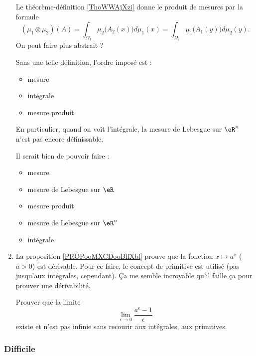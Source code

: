 \begin{enumerate}
        Le théorème-définition \ref{ThoWWAjXzi} donne le produit de mesures par la formule
        \begin{equation}  
            (\mu_1\otimes \mu_2)(A)=\int_{\Omega_1}\mu_2\big( A_2(x) \big)d\mu_1(x)=\int_{\Omega_2}\mu_1\big( A_1(y) \big)d\mu_2(y).
        \end{equation}
        On peut faire plus abstrait ?

        Sans une telle définition, l'ordre imposé est :
        \begin{itemize}
            \item mesure
            \item intégrale
            \item mesure produit.
        \end{itemize}
        En particulier, quand on voit l'intégrale, la mesure de Lebesgue sur \( \eR^n\) n'est pas encore définissable.

        Il serait bien de pouvoir faire :
        \begin{itemize}
            \item mesure
            \item mesure de Lebesgue sur \( \eR\)
            \item mesure produit
            \item mesure de Lebesgue sur \( \eR^n\)
            \item intégrale.
        \end{itemize}

    \item
        La proposition \ref{PROPooMXCDooBffXbl} prouve que la fonction \( x\mapsto a^x\) (\( a>0\)) est dérivable. Pour ce faire, le concept de primitive est utilisé (pas jusqu'aux intégrales, cependant). Ça me semble incroyable qu'il faille ça pour prouver une dérivabilité.

        Prouver que la limite
        \begin{equation}
            \lim_{\epsilon\to 0}\frac{ a^{\epsilon}-1 }{ \epsilon }
        \end{equation}
        existe et n'est pas infinie sans recourir aux intégrales, aux primitives.
\end{enumerate}

\subsubsection{Difficile}

